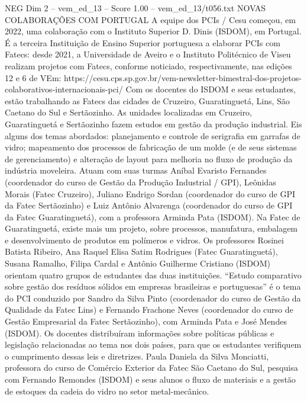 \begin{textsample}{NEG Dim 2 – vem\_ed\_13 – Score 1.00 – vem\_ed\_13/t056.txt}  \label{ex:f2_neg_055}
NOVAS COLABORAÇÕES COM PORTUGAL A equipe dos PCIs / Cesu começou, em 2022, uma colaboração com o Instituto Superior D.
Dinis (ISDOM), em Portugal.
É a terceira Instituição de Ensino Superior portuguesa a elaborar PCIs com Fatecs: desde 2021, a Universidade de Aveiro e o Instituto Politécnico de Viseu realizam projetos com Fatecs, conforme noticiado, respectivamente, nas edições 12 e 6 de VEm: https://cesu.cps.sp.gov.br/vem-newsletter-bimestral-dos-projetos-colaborativos-internacionais-pci/ Com os docentes do ISDOM e seus estudantes, estão trabalhando as Fatecs das cidades de Cruzeiro, Guaratinguetá, Lins, São Caetano do Sul e Sertãozinho.
As unidades localizadas em Cruzeiro, Guaratinguetá e Sertãozinho fazem estudos em gestão da produção industrial.
Eis alguns dos temas abordados: planejamento e controle de serigrafia em garrafas de vidro; mapeamento dos processos de fabricação de um molde (e de seus sistemas de gerenciamento) e alteração de layout para melhoria no fluxo de produção da indústria moveleira.
Atuam com suas turmas Aníbal Evaristo Fernandes (coordenador do curso de Gestão da Produção Industrial / GPI), Leônidas Morais (Fatec Cruzeiro), Juliano Endrigo Sordan (coordenador do curso de GPI da Fatec Sertãozinho) e Luiz Antônio Alvarenga (coordenador do curso de GPI da Fatec Guaratinguetá), com a professora Arminda Pata (ISDOM).
Na Fatec de Guaratinguetá, existe mais um projeto, sobre processos, manufatura, embalagem e desenvolvimento de produtos em polímeros e vidros.
Os professores Rosinei Batista Ribeiro, Ana Raquel Elisa Satim Rodrigues (Fatec Guaratinguetá), Susana Ramalho, Filipa Cardal e Antônio Guilherme Cristiano (ISDOM) orientam quatro grupos de estudantes das duas instituições. “Estudo comparativo sobre gestão dos resíduos sólidos em empresas brasileiras e portuguesas” é o tema do PCI conduzido por Sandro da Silva Pinto (coordenador do curso de Gestão da Qualidade da Fatec Lins) e Fernando Frachone Neves (coordenador do curso de Gestão Empresarial da Fatec Sertãozinho), com Arminda Pata e José Mendes (ISDOM).
Os docentes distribuíram informações sobre políticas públicas e legislação relacionadas ao tema nos dois países, para que os estudantes verifiquem o cumprimento dessas leis e diretrizes.
Paula Daniela da Silva Monciatti, professora do curso de Comércio Exterior da Fatec São Caetano do Sul, pesquisa com Fernando Remondes (ISDOM) e seus alunos o fluxo de materiais e a gestão de estoques da cadeia do vidro no setor metal-mecânico.

\end{textsample}

